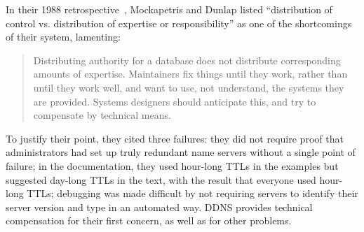 In their 1988 retrospective~\cite{dns}, Mockapetris and Dunlap
listed ``distribution of control vs. distribution of expertise
or responsibility'' as one of the shortcomings of their system,
lamenting:
\begin{quote}
Distributing authority for a database does not distribute
corresponding amounts of expertise.  Maintainers fix things
until they work, rather than until they work well, and want to use,
not understand, the systems they are provided.
Systems designers should anticipate this, and try to
compensate by technical means.
\end{quote}
To justify their point, they cited three failures:
they did not require proof that administrators had set up
truly redundant name servers without a single point of failure;
in the documentation, they used hour-long TTLs 
in the examples but suggested
day-long TTLs in the text, with the result that everyone used
hour-long TTLs; debugging was made difficult by not requiring
servers to identify their server version and type in an automated way.
DDNS provides technical compensation for their first concern,
as well as for other problems.

